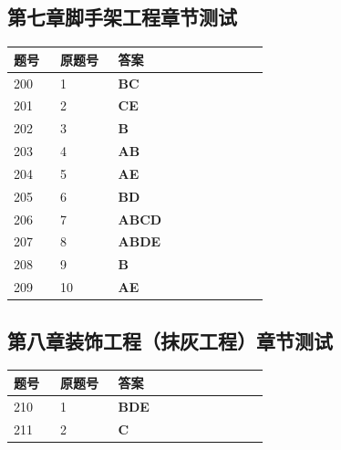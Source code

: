 \documentclass[UTF8,fontset=windows,11pt]{ctexart}
\begin{document}
\subsection*{第七章脚手架工程章节测试}
\begin{longtable}{p{0.16\linewidth}p{0.2\linewidth}p{0.52\linewidth}}
\textbf{\textcolor{examnavy}{题号}} & \textbf{\textcolor{examnavy}{原题号}} & \textbf{\textcolor{answergreen}{答案}} \\
\hline
200 & 1 & \textbf{\textcolor{answergreen}{BC}} \\
201 & 2 & \textbf{\textcolor{answergreen}{CE}} \\
202 & 3 & \textbf{\textcolor{answergreen}{B}} \\
203 & 4 & \textbf{\textcolor{answergreen}{AB}} \\
204 & 5 & \textbf{\textcolor{answergreen}{AE}} \\
205 & 6 & \textbf{\textcolor{answergreen}{BD}} \\
206 & 7 & \textbf{\textcolor{answergreen}{ABCD}} \\
207 & 8 & \textbf{\textcolor{answergreen}{ABDE}} \\
208 & 9 & \textbf{\textcolor{answergreen}{B}} \\
209 & 10 & \textbf{\textcolor{answergreen}{AE}} \\
\end{longtable}
\vspace{0.4em}
\subsection*{第八章装饰工程（抹灰工程）章节测试}
\begin{longtable}{p{0.16\linewidth}p{0.2\linewidth}p{0.52\linewidth}}
\textbf{\textcolor{examnavy}{题号}} & \textbf{\textcolor{examnavy}{原题号}} & \textbf{\textcolor{answergreen}{答案}} \\
\hline
210 & 1 & \textbf{\textcolor{answergreen}{BDE}} \\
211 & 2 & \textbf{\textcolor{answergreen}{C}} \\
\end{longtable}
\vspace{0.4em}
\end{document}
